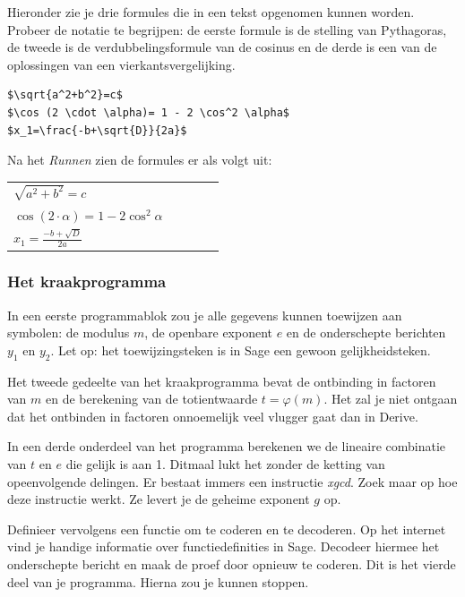 Hieronder zie je drie formules die in een tekst opgenomen kunnen worden. Probeer de notatie te begrijpen: de eerste formule is de stelling van Pythagoras, de tweede is de verdubbelingsformule van de cosinus en de derde is een van de oplossingen van een vierkantsvergelijking.

\begin{minipage}{\textwidth}
\vspace{2 mm}
\begin{verbatim}
$\sqrt{a^2+b^2}=c$
$\cos (2 \cdot \alpha)= 1 - 2 \cos^2 \alpha$
$x_1=\frac{-b+\sqrt{D}}{2a}$
\end{verbatim}
\vspace{2 mm}
\end{minipage} 

\noindent Na het \emph{Runnen} zien de formules er als volgt uit:

\vspace{2 mm}
\begin{tabular}{lllll}
$\sqrt{a^2+b^2}=c$ &&&&\\
$\cos (2 \cdot \alpha)= 1 - 2 \cos^2 \alpha$ &&&&\\
$x_1=\frac{-b+\sqrt{D}}{2a}$ &&&&\\
\end{tabular}
\vspace{2 mm}

\subsubsection*{Het kraakprogramma}

In een eerste programmablok zou je alle gegevens kunnen toewijzen aan symbolen: de modulus $m$, de openbare exponent $e$ en de onderschepte berichten $y_1$ en $y_2$. Let op: het toewijzingsteken is in Sage een gewoon gelijkheidsteken.

Het tweede gedeelte van het kraakprogramma bevat de ontbinding in factoren van $m$ en de berekening van de totientwaarde $t=\varphi(m)$. Het zal je niet ontgaan dat het ontbinden in factoren onnoemelijk veel vlugger gaat dan in Derive.

In een derde onderdeel van het programma berekenen we de lineaire combinatie van $t$ en $e$ die gelijk is aan 1. Ditmaal lukt het zonder de ketting van opeenvolgende delingen. Er bestaat immers een instructie \emph{xgcd}. Zoek maar op hoe deze instructie werkt. Ze levert je de geheime exponent $g$ op.

Definieer vervolgens een functie om te coderen en te decoderen. Op het internet vind je handige  informatie over functiedefinities in Sage. Decodeer hiermee het onderschepte bericht en maak de proef door opnieuw te coderen. Dit is het vierde deel van je programma. Hierna zou je kunnen stoppen.

